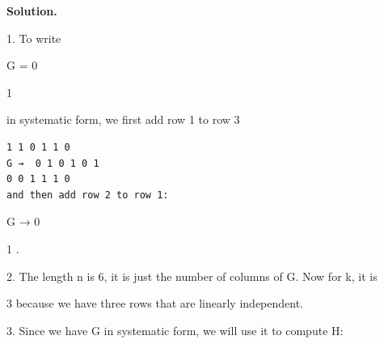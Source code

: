 \documentclass[11pt]{article}
\begin{document}
\begin{solutionbox}
\textbf{Solution.}

1. To write

G =  0

1

in systematic form, we first add row 1 to row 3

\begin{Verbatim}[fontsize=\small]
1 1 0 1 1 0
G →  0 1 0 1 0 1
0 0 1 1 1 0
and then add row 2 to row 1:
\end{Verbatim}
G →  0

1  .

2. The length n is 6, it is just the number of columns of G. Now for k, it is

3 because we have three rows that are linearly independent.

3. Since we have G in systematic form, we will use it to compute H:


\end{solutionbox}
\end{document}
